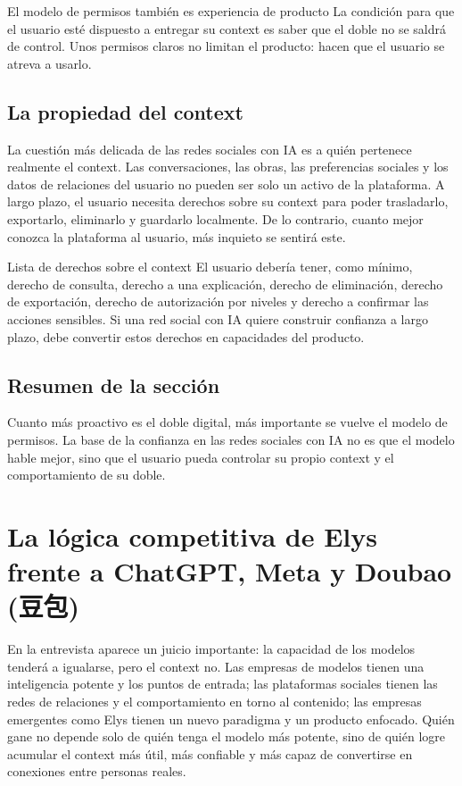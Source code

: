 \documentclass[a4paper]{article}
\begin{document}
\begin{knowledgebox}{El modelo de permisos también es experiencia de producto}
La condición para que el usuario esté dispuesto a entregar su context es saber que el doble no se saldrá de control. Unos permisos claros no limitan el producto: hacen que el usuario se atreva a usarlo.
\end{knowledgebox}

\subsection{La propiedad del context}

La cuestión más delicada de las redes sociales con IA es a quién pertenece realmente el context. Las conversaciones, las obras, las preferencias sociales y los datos de relaciones del usuario no pueden ser solo un activo de la plataforma. A largo plazo, el usuario necesita derechos sobre su context para poder trasladarlo, exportarlo, eliminarlo y guardarlo localmente. De lo contrario, cuanto mejor conozca la plataforma al usuario, más inquieto se sentirá este.

\begin{importantbox}{Lista de derechos sobre el context}
El usuario debería tener, como mínimo, derecho de consulta, derecho a una explicación, derecho de eliminación, derecho de exportación, derecho de autorización por niveles y derecho a confirmar las acciones sensibles. Si una red social con IA quiere construir confianza a largo plazo, debe convertir estos derechos en capacidades del producto.
\end{importantbox}

\subsection{Resumen de la sección}

Cuanto más proactivo es el doble digital, más importante se vuelve el modelo de permisos. La base de la confianza en las redes sociales con IA no es que el modelo hable mejor, sino que el usuario pueda controlar su propio context y el comportamiento de su doble.
\section{La lógica competitiva de Elys frente a ChatGPT, Meta y Doubao (豆包)}

En la entrevista aparece un juicio importante: la capacidad de los modelos tenderá a igualarse, pero el context no. Las empresas de modelos tienen una inteligencia potente y los puntos de entrada; las plataformas sociales tienen las redes de relaciones y el comportamiento en torno al contenido; las empresas emergentes como Elys tienen un nuevo paradigma y un producto enfocado. Quién gane no depende solo de quién tenga el modelo más potente, sino de quién logre acumular el context más útil, más confiable y más capaz de convertirse en conexiones entre personas reales.
\end{document}

